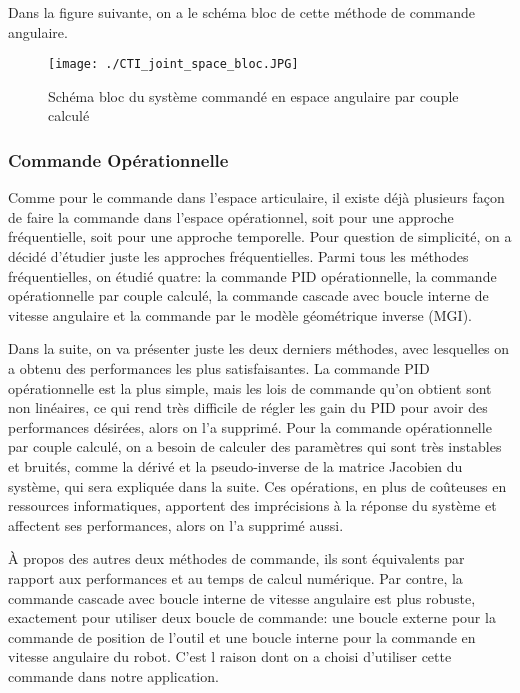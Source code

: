 Dans la figure suivante, on a le schéma bloc de cette méthode de commande angulaire.

\begin{figure}[H]
	\begin{center}
		\captionsetup{justification=centering,margin=1cm}	
		\texttt{[image: ./CTI\_joint\_space\_bloc.JPG]}
		\caption{Schéma bloc du système commandé en espace angulaire par couple calculé}
		\label{fig:CTI_joint_space_diagram}
	\end{center}
\end{figure}

\subsubsection{Commande Opérationnelle}\label{Comm_Cart}

Comme pour le commande dans l'espace articulaire, il existe déjà plusieurs façon de faire la commande dans l'espace opérationnel, soit pour une approche fréquentielle, soit pour une approche temporelle. Pour question de simplicité, on a décidé d'étudier juste les approches fréquentielles. Parmi tous les méthodes fréquentielles, on étudié quatre: la commande PID opérationnelle, la commande opérationnelle par couple calculé, la commande cascade avec boucle interne de vitesse angulaire et la commande par le modèle géométrique inverse (MGI).

Dans la suite, on va présenter juste les deux derniers méthodes, avec lesquelles on a obtenu des performances les plus satisfaisantes. La commande PID opérationnelle est la plus simple, mais les lois de commande qu'on obtient sont non linéaires, ce qui rend très difficile de régler les gain du PID pour avoir des performances désirées, alors on l'a supprimé. Pour la commande opérationnelle par couple calculé, on a besoin de calculer des paramètres qui sont très instables et bruités, comme la dérivé et la pseudo-inverse de la matrice Jacobien du système, qui sera expliquée dans la suite. Ces opérations, en plus de coûteuses en ressources informatiques, apportent des imprécisions à la réponse du système et affectent ses performances, alors on l'a supprimé aussi.

À propos des autres deux méthodes de commande, ils sont équivalents par rapport aux performances et au temps de calcul numérique. Par contre, la commande cascade avec boucle interne de vitesse angulaire est plus robuste, exactement pour utiliser deux boucle de commande: une boucle externe pour la commande de position de l'outil et une boucle interne pour la commande en vitesse angulaire du robot. C'est l raison dont on a choisi d'utiliser cette commande dans notre application.
\newline

